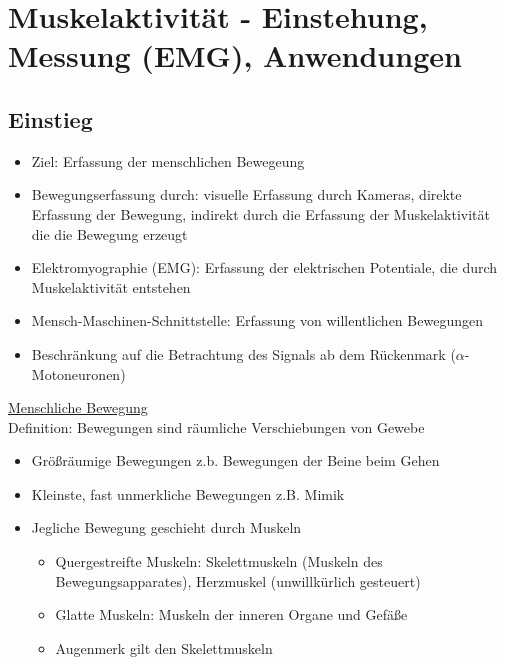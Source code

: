 \documentclass[a4paper,10pt,oneside]{article}
\begin{document}
\section{Muskelaktivität - Einstehung, Messung (EMG), Anwendungen}
\subsection{Einstieg}

\begin{itemize}
	\item Ziel: Erfassung der menschlichen Bewegeung 
	\item Bewegungserfassung durch: visuelle Erfassung durch Kameras, direkte Erfassung der Bewegung, indirekt durch die Erfassung der Muskelaktivität die die Bewegung erzeugt
	\item Elektromyographie (EMG): Erfassung der elektrischen Potentiale, die durch Muskelaktivität entstehen
	\item Mensch-Maschinen-Schnittstelle: Erfassung von willentlichen Bewegungen
	\item Beschränkung auf die Betrachtung des Signals ab dem Rückenmark ($\alpha$-Motoneuronen)
\end{itemize}

\underline{Menschliche Bewegung} \\
Definition: Bewegungen sind räumliche Verschiebungen von Gewebe
	\begin{itemize}
		\item Größräumige Bewegungen z.b. Bewegungen der Beine beim Gehen
		\item Kleinste, fast unmerkliche Bewegungen z.B. Mimik
		\item Jegliche Bewegung geschieht durch Muskeln
			\begin{itemize}
				\item Quergestreifte Muskeln: Skelettmuskeln (Muskeln des Bewegungsapparates), Herzmuskel (unwillkürlich gesteuert)
				\item Glatte Muskeln: Muskeln der inneren Organe und Gefäße
				\item Augenmerk gilt den Skelettmuskeln
			\end{itemize}
	\end{itemize}
\end{document}
